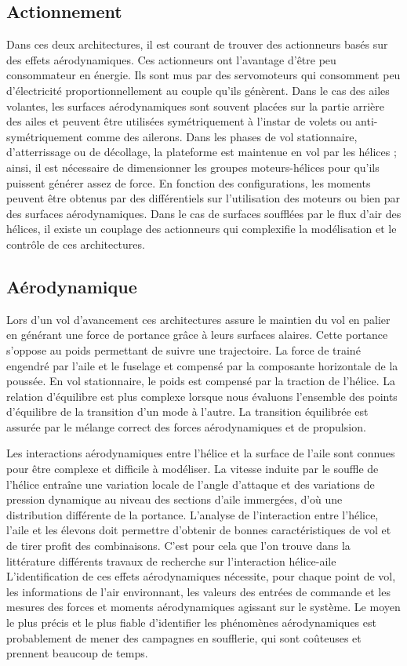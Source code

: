     \subsection{Actionnement}
    Dans ces deux architectures, il est courant de trouver des actionneurs basés sur des effets aérodynamiques. Ces actionneurs ont l'avantage d'être peu consommateur en énergie. Ils sont mus par des servomoteurs qui consomment peu d'électricité proportionnellement au couple qu'ils génèrent. Dans le cas des ailes volantes, les surfaces aérodynamiques sont souvent placées sur la partie arrière des ailes et peuvent être utilisées symétriquement à l'instar de volets ou anti-symétriquement comme des ailerons. 
    Dans les phases de vol stationnaire, d'atterrissage ou de décollage, la plateforme est maintenue en vol par les hélices ; ainsi, il est nécessaire de dimensionner les groupes moteurs-hélices pour qu'ils puissent générer assez de force. En fonction des configurations, les moments peuvent être obtenus par des différentiels sur l'utilisation des moteurs ou bien par des surfaces aérodynamiques. Dans le cas de surfaces soufflées par le flux d'air des hélices, il existe un couplage des actionneurs qui complexifie la modélisation et le contrôle de ces architectures.

    \subsection{Aérodynamique}

    Lors d'un vol d'avancement ces architectures assure le maintien du vol en palier en générant une force de portance grâce à leurs surfaces alaires. Cette portance s'oppose au poids permettant de suivre une trajectoire. La force de trainé engendré par l'aile et le fuselage et compensé par la composante horizontale de la poussée. En vol stationnaire, le poids est compensé par la traction de l'hélice. La relation d'équilibre est plus complexe lorsque nous évaluons l'ensemble des points d'équilibre de la transition d'un mode à l'autre. La transition équilibrée est assurée par le mélange correct des forces aérodynamiques et de propulsion.

    Les interactions aérodynamiques entre l'hélice et la surface de l'aile sont connues pour être complexe et difficile à modéliser. La vitesse induite par le souffle de l'hélice entraîne une variation locale de l'angle d'attaque et des variations de pression dynamique au niveau des sections d'aile immergées, d'où une distribution différente de la portance. L'analyse de l'interaction entre l'hélice, l'aile et les élevons doit permettre d'obtenir de bonnes caractéristiques de vol et de tirer profit des combinaisons. C'est pour cela que l'on trouve dans la littérature différents travaux de recherche sur l'interaction hélice-aile 
     L'identification de ces effets aérodynamiques nécessite, pour chaque point de vol, les informations de l'air environnant, les valeurs des entrées de commande et les mesures des forces et moments aérodynamiques agissant sur le système. Le moyen le plus précis et le plus fiable d'identifier les phénomènes aérodynamiques est probablement de mener des campagnes en soufflerie, qui sont coûteuses et prennent beaucoup de temps.


